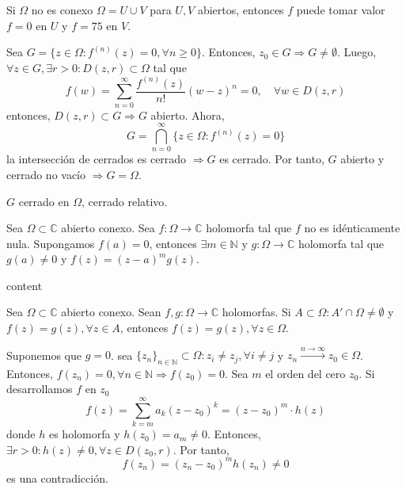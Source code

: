 \begin{obs}
  Si $\Omega$ no es conexo $\Omega = U \cup V$ para $U, V$ abiertos, entonces $f$ puede tomar valor $f = 0$ en $U$ y $f = 75$ en $V$.
\end{obs}

\begin{dem}
  Sea $G = \{  z \in \Omega : f^{(n)}(z) = 0, \forall n \geq 0 \}$. Entonces, $z_{0} \in G \Rightarrow G \neq \emptyset$. Luego, $\forall z \in G, \exists r > 0 : D(z, r) \subset \Omega$ tal que 
  \[ 
    f(w) = \sum_{n = 0}^{\infty} \frac{f^{(n)}(z)}{n!}(w - z)^{n} = 0, \quad \forall w \in D(z, r) 
  \] 
  entonces, $D(z, r) \subset G \Rightarrow G$ abierto. Ahora, 
  \[ 
    G = \bigcap_{n = 0}^{\infty} \{ z \in \Omega : f^{(n)}(z) = 0 \}
  \] 
  la intersección de cerrados es cerrado $\Rightarrow G$ es cerrado. Por tanto, $G$ abierto y cerrado no vacío $\Rightarrow G = \Omega$.
\end{dem}

\begin{obs}
  $G$ cerrado en $\Omega$, cerrado relativo.
\end{obs}

\begin{cor}
  Sea $\Omega \subset \mathbb{C}$ abierto conexo. Sea $f : \Omega \to \mathbb{C}$ holomorfa tal que $f$ no es idénticamente nula. Supongamos $f(a) = 0$, entonces $\exists m \in \mathbb{N}$ y $g : \Omega \to  \mathbb{C}$ holomorfa tal que $g(a) \neq 0$ y $f(z) = (z-a)^{m} g(z)$.
\end{cor}

\begin{dem}
  content
\end{dem}

\begin{theo}
  Sea $\Omega \subset \mathbb{C}$ abierto conexo. Sean $f,g : \Omega \to \mathbb{C}$ holomorfas. Si $A \subset \Omega : A' \cap \Omega \neq \emptyset$ y $f(z) = g(z), \forall z \in A$, entonces  $f(z) = g(z), \forall z \in \Omega$.
\end{theo}

\begin{dem}
  Suponemos que $g = 0$. sea $\{ z_{n} \}_{n \in \mathbb{N}} \subset \Omega : z_{i} \neq z_{j}, \forall i \neq j$ y $z_{n} \xrightarrow[]{ n \rightarrow \infty } z_{0} \in \Omega$. Entonces, $f(z_{n}) = 0, \forall n \in \mathbb{N} \Rightarrow f(z_{0}) = 0$. Sea $m$ el orden del cero $z_{0}$. Si desarrollamos $f$ en $z_{0}$
  \[ 
    f(z) = \sum_{k = m}^{\infty} a_{k}(z - z_{0})^{k} = (z - z_{0})^{m} \cdot h(z) 
  \] 
  donde $h$ es holomorfa y $h(z_{0}) = a_{m} \neq 0$. Entonces, $\exists r > 0 : h(z) \neq 0, \forall z \in D(z_{0}, r)$. Por tanto,
  \[ 
    f(z_{n}) = (z_{n} - z_{0})^{m} h(z_{n}) \neq 0
  \] 
  es una contradicción.
\end{dem}

